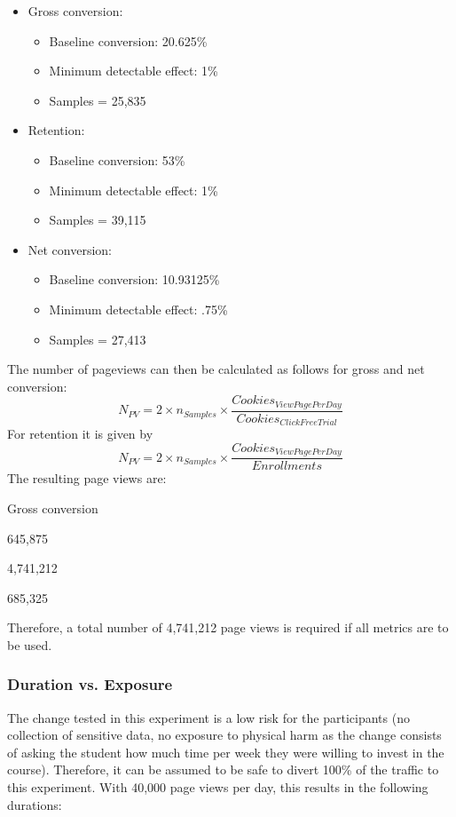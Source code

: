 \documentclass[11pt]{article} %
\begin{document}
\begin{itemize}
\item Gross conversion:
	\begin{itemize}
		\item Baseline conversion: 20.625\%
		\item Minimum detectable effect: 1\%
		\item Samples = 25,835
	\end{itemize}
\item Retention:
	\begin{itemize}
		\item Baseline conversion: 53\%
		\item Minimum detectable effect: 1\%
		\item Samples = 39,115
	\end{itemize}
\item Net conversion:
	\begin{itemize}
		\item Baseline conversion: 10.93125\%
		\item Minimum detectable effect: .75\%
		\item Samples = 27,413
	\end{itemize}
\end{itemize}
The number of pageviews can then be calculated as follows for gross and net conversion:
\begin{equation}
	N_{PV} = 2 \times n_{Samples} \times \frac{Cookies_{ViewPagePerDay}}{Cookies_{ClickFreeTrial}}
\end{equation}
For retention it is given by
\begin{equation}
	N_{PV} = 2 \times n_{Samples} \times \frac{Cookies_{ViewPagePerDay}}{Enrollments}
\end{equation}
The resulting page views are:
\begin{labeling}{Gross conversion}
\item[Gross Conversion] 645,875
\item[Retention]  4,741,212
\item[Net Conversion]  685,325
\end{labeling}
Therefore, a total number of 4,741,212 page views is required if all metrics are to be used.

\subsubsection{Duration vs. Exposure}

The change tested in this experiment is a low risk for the participants (no collection of sensitive data, no exposure to physical harm as the change consists of asking the student how much time per week they were willing to invest in the course). Therefore, it can be assumed to be safe to divert 100\% of the traffic to this experiment. With 40,000 page views per day, this results in the following durations:
\end{document}
